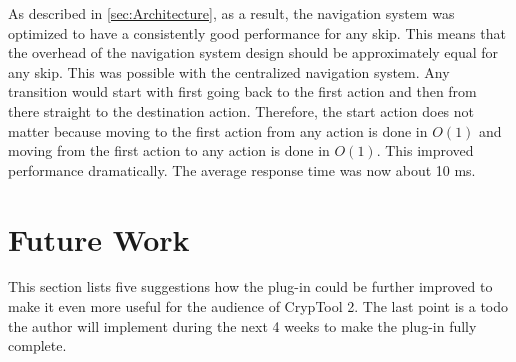 \begin{enumerate}[label=(\labelenum{S}{{\arabic*}}), wide, labelwidth=!, labelindent=0pt]
As described in \autoref{sec:Architecture}, as a result, the navigation system was optimized to have a consistently good performance for any skip. This means that the overhead of the navigation system design should be approximately equal for any skip. This was possible with the centralized navigation system. Any transition would start with first going back to the first action and then from there straight to the destination action. Therefore, the start action does not matter because moving to the first action from any action is done in $O(1)$ and moving from the first action to any action is done in $O(1)$. This improved performance dramatically. The average response time was now about 10 ms.


\end{enumerate}

\section{Future Work}
\label{sec:futureWork}

This section lists five suggestions how the plug-in could be further improved to make it even more useful for the audience of CrypTool 2. The last point is a todo the author will implement during the next 4 weeks to make the plug-in fully complete.

